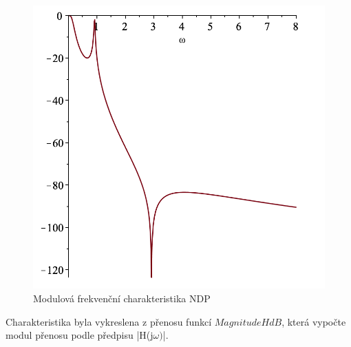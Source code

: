 \documentclass[twoside]{article}
\begin{document}
\begin{figure}[H]
\centering
\includegraphics[scale=0.6]{sch.png}
\caption{Modulová frekvenční charakteristika NDP}
\end{figure}
\noindent Charakteristika byla vykreslena z přenosu funkcí $MagnitudeHdB$, která vypočte modul přenosu podle předpisu |H(j$\omega)$|.
\end{document}
